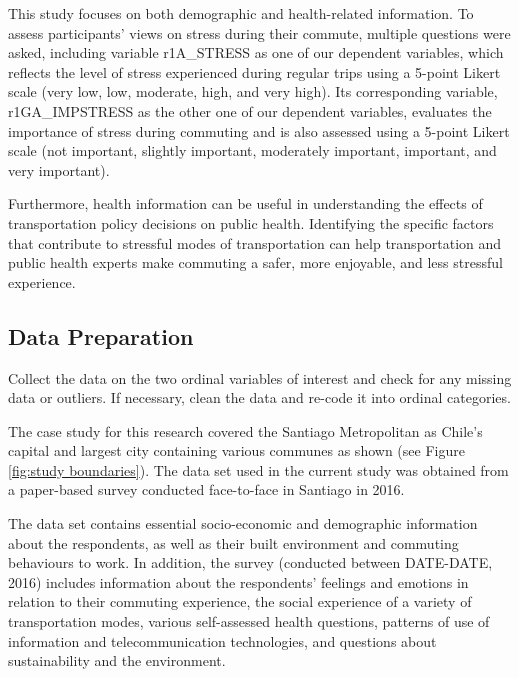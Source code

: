 \documentclass[
11pt, %
oneside, %
english, %
singlespacing, %
]{macthesis} %
\begin{document}
This study focuses on both demographic and health-related information. To assess participants' views on stress during their commute, multiple questions were asked, including variable r1A\_STRESS as one of our dependent variables, which reflects the level of stress experienced during regular trips using a 5-point Likert scale (very low, low, moderate, high, and very high). Its corresponding variable, r1GA\_IMPSTRESS as the other one of our dependent variables, evaluates the importance of stress during commuting and is also assessed using a 5-point Likert scale (not important, slightly important, moderately important, important, and very important).

Furthermore, health information can be useful in understanding the effects of transportation policy decisions on public health. Identifying the specific factors that contribute to stressful modes of transportation can help transportation and public health experts make commuting a safer, more enjoyable, and less stressful experience.

\hypertarget{data-preparation}{%
\subsection{Data Preparation}\label{data-preparation}}

Collect the data on the two ordinal variables of interest and check for any missing data or outliers. If necessary, clean the data and re-code it into ordinal categories.

The case study for this research covered the Santiago Metropolitan as Chile's capital and largest city containing various communes as shown (see Figure \ref{fig:study boundaries}). The data set used in the current study was obtained from a paper-based survey conducted face-to-face in Santiago in 2016.

The data set contains essential socio-economic and demographic information about the respondents, as well as their built environment and commuting behaviours to work. In addition, the survey (conducted between DATE-DATE, 2016) includes information about the respondents' feelings and emotions in relation to their commuting experience, the social experience of a variety of transportation modes, various self-assessed health questions, patterns of use of information and telecommunication technologies, and questions about sustainability and the environment.
\end{document}
